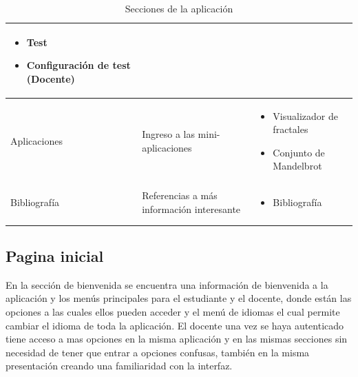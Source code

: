 \documentclass[letterpaper, 11pt, oneside]{article}
\theoremstyle{definition}
\theoremstyle{remark}
\begin{document}
\begin{table}[h]
\begin{tabular}[htb]{ p{2cm} | p{3.5cm} | p{6.5cm} }
\begin{itemize}[itemsep=0pt,topsep=-5pt]
\item Test                                                                                                                                                                                                                                                                                                                                                                           
\item Configuración de test (Docente)
 \end{itemize}
\\
\midrule
 Aplicaciones & Ingreso a las mini-aplicaciones   &  \begin{itemize}[itemsep=0pt,topsep=-5pt]                                                                                                                                                                                                                                                                                                                                                                                 
\item Visualizador de fractales
\item Conjunto de Mandelbrot
 \end{itemize}
 \\ 
\midrule
 Bibliografía & Referencias a más información interesante & \begin{itemize}[itemsep=0pt,topsep=-5pt] \item Bibliografía  \end{itemize} \\ \\
\bottomrule
\end{tabular}
 \caption{Secciones de la aplicación}
 \label{mapa}
 \end{table}

\clearpage
\newpage

\subsection{Pagina inicial}

En la sección de bienvenida se encuentra una información de bienvenida a la aplicación y los menús principales para el estudiante y el docente, donde están las opciones a las cuales ellos pueden acceder y el menú de idiomas el cual permite cambiar el idioma de toda la aplicación. El docente una vez se haya autenticado tiene acceso a mas opciones en la misma aplicación y en las mismas secciones sin necesidad de tener que entrar a opciones confusas, también en la misma presentación creando una familiaridad con la interfaz.
\end{document}
